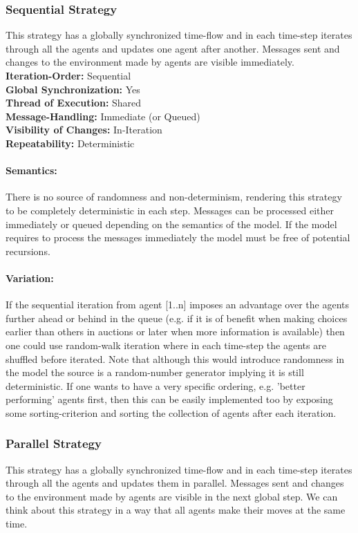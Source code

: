 \subsubsection{Sequential Strategy}
This strategy has a globally synchronized time-flow and in each time-step iterates through all the agents and updates one agent after another. Messages sent and changes to the environment made by agents are visible immediately. \\

\textbf{Iteration-Order:} Sequential \\
\textbf{Global Synchronization:} Yes \\
\textbf{Thread of Execution:} Shared \\
\textbf{Message-Handling:} Immediate (or Queued) \\
\textbf{Visibility of Changes:}	In-Iteration \\
\textbf{Repeatability:}	Deterministic 
	
\paragraph{Semantics:} There is no source of randomness and non-determinism, rendering this strategy to be completely deterministic in each step. Messages can be processed either immediately or queued depending on the semantics of the model. If the model requires to process the messages immediately the model must be free of potential recursions.

\paragraph{Variation:} If the sequential iteration from agent [1..n] imposes an advantage over the agents further ahead or behind in the queue (e.g. if it is of benefit when making choices earlier than others in auctions or later when more information is available) then one could use random-walk iteration where in each time-step the agents are shuffled before iterated. Note that although this would introduce randomness in the model the source is a random-number generator implying it is still deterministic. If one wants to have a very specific ordering, e.g. 'better performing' agents first, then this can be easily implemented too by exposing some sorting-criterion and sorting the collection of agents after each iteration.

\subsubsection{Parallel Strategy}
This strategy has a globally synchronized time-flow and in each time-step iterates through all the agents and updates them in parallel. Messages sent and changes to the environment made by agents are visible in the next global step. We can think about this strategy in a way that all agents make their moves at the same time. \\


